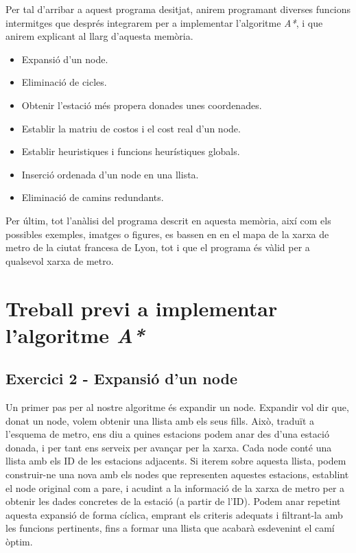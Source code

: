 \documentclass[a4paper,12pt]{article}
\begin{document}
        Per tal d’arribar a aquest programa desitjat, anirem programant diverses funcions intermitges que després integrarem per a implementar l’algoritme \textit{A*}, i que anirem explicant al llarg d’aquesta memòria.
        \begin{itemize}
            \item Expansió d’un node.
            \item Eliminació de cicles.
            \item Obtenir l’estació més propera donades unes coordenades.
            \item Establir la matriu de costos i el cost real d’un node.
            \item Establir heuristiques i funcions heurístiques globals.
            \item Inserció ordenada d’un node en una llista.
            \item Eliminació de camins redundants.
        \end{itemize}

        Per últim, tot l’anàlisi del programa descrit en aquesta memòria, així com els possibles exemples, imatges o figures, es bassen en en el mapa de la xarxa de metro de la ciutat francesa de Lyon, tot i que el programa és vàlid per a qualsevol xarxa de metro.


    \pagebreak

    \section{Treball previ a implementar l'algoritme \textit{A*}}

        \subsection{Exercici 2 - Expansió d’un node}

            Un primer pas per al nostre algoritme és expandir un node. Expandir vol dir que, donat un node, volem obtenir una llista amb els seus fills. Això, traduït a l’esquema de metro, ens diu a quines estacions podem anar des d’una estació donada, i per tant ens serveix per avançar per la xarxa.
            Cada node conté una llista amb els ID de les estacions adjacents. Si iterem sobre aquesta llista, podem construir-ne una nova amb els nodes que representen aquestes estacions, establint el node original com a pare, i acudint a la informació de la xarxa de metro per a obtenir les dades concretes de la estació (a partir de l’ID).
            Podem anar repetint aquesta expansió de forma cíclica, emprant els criteris adequats i filtrant-la amb les funcions pertinents, fins a formar una llista que acabarà esdevenint el camí òptim.
\end{document}
